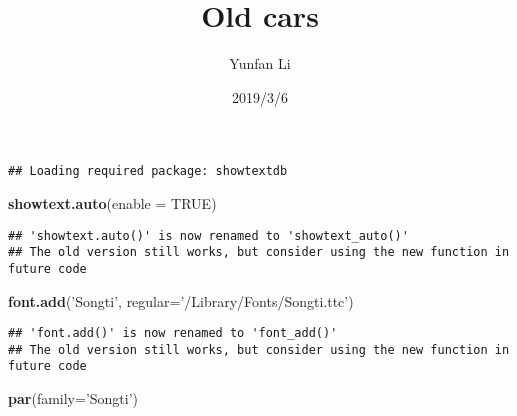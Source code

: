 \documentclass[]{article}
\title{Old cars}
\author{Yunfan Li}
\date{2019/3/6}
\newenvironment{Shaded}{\begin{snugshade}}{\end{snugshade}}
\newcommand{\KeywordTok}[1]{\textcolor[rgb]{0.13,0.29,0.53}{\textbf{#1}}}
\newcommand{\DataTypeTok}[1]{\textcolor[rgb]{0.13,0.29,0.53}{#1}}
\newcommand{\StringTok}[1]{\textcolor[rgb]{0.31,0.60,0.02}{#1}}
\newcommand{\OtherTok}[1]{\textcolor[rgb]{0.56,0.35,0.01}{#1}}
\newcommand{\OperatorTok}[1]{\textcolor[rgb]{0.81,0.36,0.00}{\textbf{#1}}}
\newcommand{\NormalTok}[1]{#1}
\begin{document}
\maketitle

\begin{Shaded}
\end{Shaded}

\begin{verbatim}
## Loading required package: showtextdb
\end{verbatim}

\begin{Shaded}
\begin{Highlighting}[]
\KeywordTok{showtext.auto}\NormalTok{(}\DataTypeTok{enable =} \OtherTok{TRUE}\NormalTok{)}
\end{Highlighting}
\end{Shaded}

\begin{verbatim}
## 'showtext.auto()' is now renamed to 'showtext_auto()'
## The old version still works, but consider using the new function in future code
\end{verbatim}

\begin{Shaded}
\begin{Highlighting}[]
\KeywordTok{font.add}\NormalTok{(}\StringTok{'Songti'}\NormalTok{, }\DataTypeTok{regular=}\StringTok{'/Library/Fonts/Songti.ttc'}\NormalTok{)}
\end{Highlighting}
\end{Shaded}

\begin{verbatim}
## 'font.add()' is now renamed to 'font_add()'
## The old version still works, but consider using the new function in future code
\end{verbatim}

\begin{Shaded}
\begin{Highlighting}[]
\KeywordTok{par}\NormalTok{(}\DataTypeTok{family=}\StringTok{'Songti'}\NormalTok{)}
\end{Highlighting}
\end{Shaded}
\end{document}
